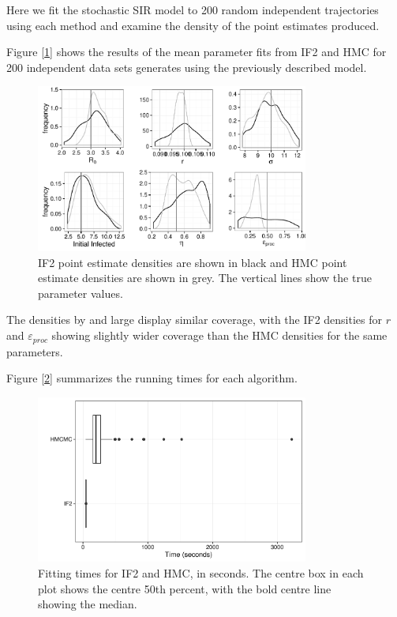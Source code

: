 	Here we fit the stochastic SIR model to 200 random independent trajectories using each method and examine the density of the point estimates produced.

	Figure [\ref{combinedmulti}] shows the results of the mean parameter fits from IF2 and HMC for 200 independent data sets generates using the previously described model.

    \begin{figure}
        \centering
        \captionsetup{width=.8\linewidth}
        \includegraphics[width=0.8\textwidth]{./images/combined-multi.pdf}
        \caption{IF2 point estimate densities are shown in black and HMC point estimate densities are shown in grey. The vertical lines show the true parameter values. \label{combinedmulti}}
    \end{figure}

    The densities by and large display similar coverage, with the IF2 densities for $r$ and $\varepsilon_{proc}$ showing slightly wider coverage than the HMC densities for the same parameters.

    Figure [\ref{sc1timeplot}] summarizes the running times for each algorithm.

	\begin{figure}
        \centering
        \captionsetup{width=.8\linewidth}
        \includegraphics[width=0.8\textwidth]{./images/timeplot.pdf}
        \caption{Fitting times for IF2 and HMC, in seconds. The centre box in each plot shows the centre 50th percent, with the bold centre line showing the median. \label{sc1timeplot}}
    \end{figure}

